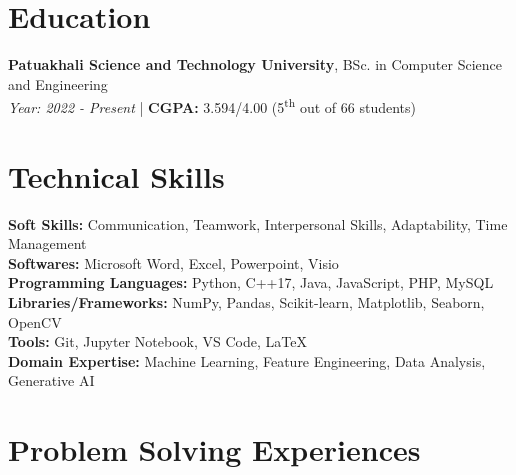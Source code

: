 \documentclass[10pt, letterpaper]{article}
\begin{document}
\section{Education}
\textbf{Patuakhali Science and Technology University}, BSc. in Computer Science and Engineering\\
\textit{Year: 2022 - Present} | \textbf{CGPA:} 3.594/4.00 (5\textsuperscript{th} out of 66 students)

\section{Technical Skills}
\textbf{Soft Skills:} Communication, Teamwork, Interpersonal Skills, Adaptability, Time Management\\
\textbf{Softwares: } Microsoft Word, Excel, Powerpoint, Visio\\
\textbf{Programming Languages:} Python, C++17, Java, JavaScript, PHP, MySQL\\
\textbf{Libraries/Frameworks:} NumPy, Pandas, Scikit-learn, Matplotlib, Seaborn, OpenCV\\
\textbf{Tools:} Git, Jupyter Notebook, VS Code, LaTeX\\
\textbf{Domain Expertise:} Machine Learning, Feature Engineering, Data Analysis, Generative AI
 \section{Problem Solving Experiences}
        
\end{document}
